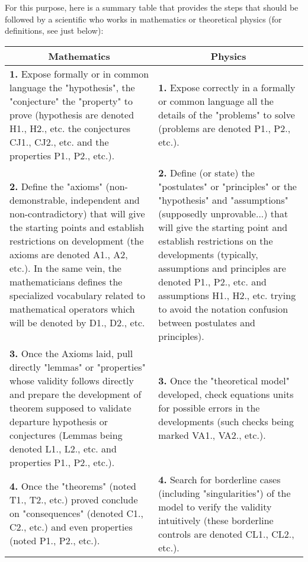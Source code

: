 	For this purpose, here is a summary table that provides the steps that should be followed by a scientific who works in mathematics or theoretical physics (for definitions, see just below)\label{methodology table}:

	\begin{table}[H]
	\begin{center}
			\begin{tabular}{|p{7.5cm}|p{7.5cm}|}
				\hline
				\multicolumn{1}{c}{\cellcolor{black!30}\textbf{Mathematics}} & 
  \multicolumn{1}{c}{\cellcolor{black!30}\textbf{Physics}} \\ \hline
				\textbf{1.} Expose formally or in common language the "hypothesis", the "conjecture" the "property" to prove (hypothesis are denoted H1., H2., etc. the conjectures CJ1., CJ2., etc. and the properties P1., P2., etc.). & \textbf{1.} Expose correctly in a formally or common language all the details of the "problems" to solve (problems are denoted P1., P2., etc.). \\ \hline
				\textbf{2.} Define the "axioms" (non-demonstrable, independent and non-contradictory) that will give the starting points and establish restrictions on development (the axioms are denoted A1., A2, etc.)\footnotemark. \newline\newline
In the same vein, the mathematicians defines the specialized vocabulary related to mathematical operators which will be denoted by D1., D2., etc. & \textbf{2.} Define (or state) the "postulates" or "principles" or the "hypothesis" and "assumptions" (supposedly unprovable...) that will give the starting point and establish restrictions on the developments (typically, assumptions and principles are denoted P1., P2., etc. and assumptions H1., H2., etc. trying to avoid the notation confusion between postulates and principles)\footnotemark. \\ \hline
				\textbf{3.} Once the Axioms laid, pull directly "lemmas" or "properties" whose validity follows directly and prepare the development of theorem supposed to validate departure hypothesis or conjectures (Lemmas being denoted L1., L2., etc. and properties P1., P2., etc.). & \textbf{3.} Once the "theoretical model" developed, check equations units for possible errors in the developments (such checks being marked VA1., VA2., etc.).\\ \hline
				\textbf{4.} Once the "theorems" (noted T1., T2., etc.) proved conclude on "consequences" (denoted C1., C2., etc.) and even properties (noted P1., P2., etc.). & \textbf{4.} Search for borderline cases (including "singularities") of the model to verify the validity intuitively (these borderline controls are denoted CL1., CL2., etc.).\\ \hline

\end{tabular}
\end{center}
\end{table}
